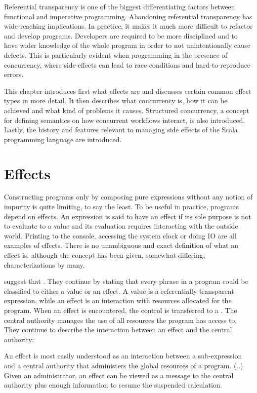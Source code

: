 Referential transparency is one of the biggest differentiating factors between functional and imperative programming. Abandoning referential transparency has wide-reaching implications. In practice, it makes it much more difficult to refactor and develop programs. Developers are required to be more disciplined and to have wider knowledge of the whole program in order to not unintentionally cause defects. This is particularly evident when programming in the presence of concurrency, where side-effects can lead to race conditions and hard-to-reproduce errors.~\cite[Chapter~3]{sicp}

This chapter introduces first what effects are and discusses certain common effect types in more detail. It then describes what concurrency is, how it can be achieved and what kind of problems it causes. Structured concurrency, a concept for defining semantics on how concurrent workflows interact, is also introduced. Lastly, the history and features relevant to managing side effects of the Scala programming language are introduced.



\section{Effects} \label{effects}
Constructing programs only by composing pure expressions without any notion of impurity is quite limiting, to say the least. To be useful in practice, programs depend on effects. An expression is said to have an effect if its sole purpose is not to evaluate to a value and its evaluation requires interacting with the outside world. Printing to the console, accessing the system clock or doing IO are all examples of effects. There is no unambiguous and exact definition of what an effect is, although the concept has been given, somewhat differing, characterizations by many.

\textcite{den-lang-specs} suggest that . They continue by stating that every phrase in a program could be classified to either a value or an effect. A value is a referentially transparent expression, while an effect is an interaction with resources allocated for the program. When an effect is encountered, the control is transferred to a . The central authority manages the use of all resources the program has access to. They continue to describe the interaction between an effect and the central authority:
\begin{displayquote}
An effect is most easily understood as an interaction between a sub-expression
and a central authority that administers the global resources of a program. (..) Given an administrator, an effect can be viewed as a message to the central authority plus enough information to resume the suspended calculation.
\end{displayquote}

